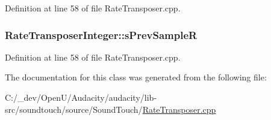 Definition at line 58 of file Rate\+Transposer.\+cpp.

\subsubsection[{\texorpdfstring{s\+Prev\+SampleR}{sPrevSampleR}}]{ Rate\+Transposer\+Integer\+::s\+Prev\+SampleR\hspace{0.3cm}{\ttfamily [protected]}}\hypertarget{class_rate_transposer_integer_a411bd9f2d245a437719a3a1691acd3c0}{}\label{class_rate_transposer_integer_a411bd9f2d245a437719a3a1691acd3c0}


Definition at line 58 of file Rate\+Transposer.\+cpp.



The documentation for this class was generated from the following file\+:\begin{DoxyCompactItemize}
\item 
C\+:/\+\_\+dev/\+Open\+U/\+Audacity/audacity/lib-\/src/soundtouch/source/\+Sound\+Touch/\hyperlink{_rate_transposer_8cpp}{Rate\+Transposer.\+cpp}\end{DoxyCompactItemize}
